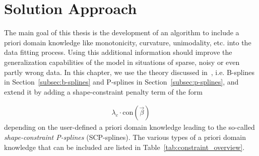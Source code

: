 \chapter{Solution Approach} \label{cha:solution-approach}

The main goal of this thesis is the development of an algorithm to include a priori domain knowledge like monotonicity, curvature, unimodality, etc. into the data fitting process. Using  this additional information should improve the generalization capabilities of the model in situations of sparse, noisy or even partly wrong data. In this chapter, we use the theory discussed in~, i.e. B-splines in Section~\ref{subsec:b-splines} and P-splines in Section~\ref{subsec:p-splines}, and extend it by adding a shape-constraint penalty term of the form 

\begin{align} \label{eq:constraint-penalty-term}
	\lambda_c \cdot \text{con}(\vec{\beta})
\end{align} 
%
depending on the user-defined a priori domain knowledge leading to the so-called \emph{shape-constraint P-splines} (SCP-splines). The various types of a priori domain knowledge that can be included are listed in Table~\ref{tab:constraint_overview}.

